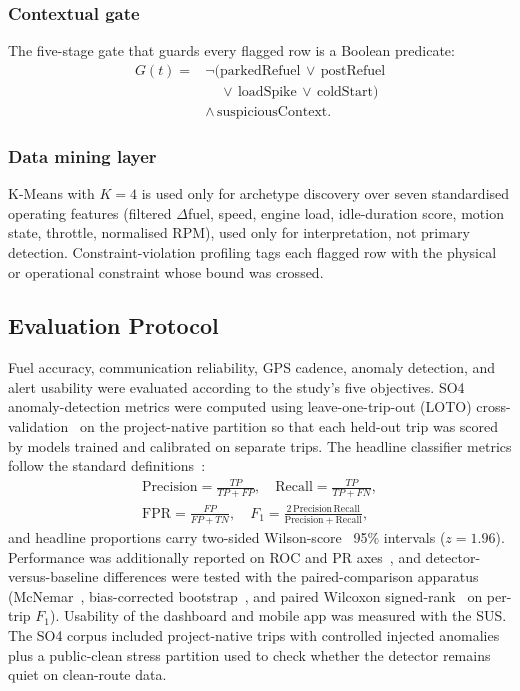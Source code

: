 \documentclass[10pt,journal]{IEEEtran}
\begin{document}
\subsubsection{Contextual gate}
The five-stage gate that guards every flagged row is a Boolean predicate:
\begin{equation}
\begin{aligned}
G(t) = {}& \neg\bigl(\text{parkedRefuel} \,\vee\, \text{postRefuel} \\
         & \phantom{\neg\bigl(}\vee\, \text{loadSpike} \,\vee\, \text{coldStart}\bigr) \\
         & \wedge\, \text{suspiciousContext}.
\end{aligned}
\label{eq:art-gate}
\end{equation}

\subsubsection{Data mining layer}
K-Means with $K = 4$ is used only for archetype discovery over seven standardised operating features (filtered $\Delta$fuel, speed, engine load, idle-duration score, motion state, throttle, normalised RPM), used only for interpretation, not primary detection. Constraint-violation profiling tags each flagged row with the physical or operational constraint whose bound was crossed.

\subsection{Evaluation Protocol}
Fuel accuracy, communication reliability, GPS cadence, anomaly detection, and alert usability were evaluated according to the study's five objectives. SO4 anomaly-detection metrics were computed using leave-one-trip-out (LOTO) cross-validation~\cite{arlot2010survey} on the project-native partition so that each held-out trip was scored by models trained and calibrated on separate trips. The headline classifier metrics follow the standard definitions~\cite{fawcett2006roc}:
\begin{equation}
\begin{gathered}
\mathrm{Precision} = \tfrac{TP}{TP+FP},\quad \mathrm{Recall} = \tfrac{TP}{TP+FN},\\
\mathrm{FPR} = \tfrac{FP}{FP+TN},\quad F_1 = \tfrac{2\,\mathrm{Precision}\,\mathrm{Recall}}{\mathrm{Precision}+\mathrm{Recall}},
\end{gathered}
\label{eq:art-metrics}
\end{equation}
and headline proportions carry two-sided Wilson-score~\cite{wilson1927probable} 95\% intervals ($z = 1.96$). Performance was additionally reported on ROC and PR axes~\cite{fawcett2006roc}, and detector-versus-baseline differences were tested with the paired-comparison apparatus (McNemar~\cite{mcnemar1947note}, bias-corrected bootstrap~\cite{efron1994bootstrap}, and paired Wilcoxon signed-rank~\cite{wilcoxon1945individual} on per-trip $F_1$). Usability of the dashboard and mobile app was measured with the SUS. The SO4 corpus included project-native trips with controlled injected anomalies plus a public-clean stress partition used to check whether the detector remains quiet on clean-route data.
\end{document}
